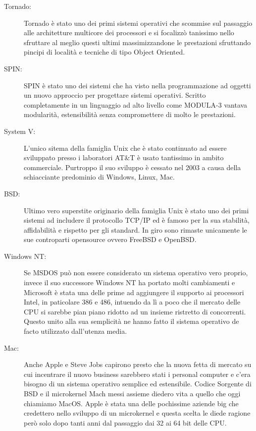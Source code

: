 \begin{description}
  \item[Tornado:] Tornado è stato uno dei primi sistemi operativi che scommise sul passaggio alle architetture multicore dei processori e si focalizzò tanissimo nello sfruttare al meglio questi ultimi massimizzandone le prestazioni sfruttando pincipi di località e tecniche di tipo Object Oriented.
  \item[SPIN:] SPIN è stato uno dei sistemi che ha visto nella programmazione ad oggetti un nuovo approccio per progettare sistemi operativi. Scritto completamente in un linguaggio ad alto livello come MODULA-3 vantava modularità, estensibilità senza compromettere di molto le prestazioni.
  \item[System V:] L'unico sitema della famiglia Unix che è stato continuato ad essere sviluppato presso i laboratori AT\&T è usato tantissimo in ambito commerciale. Purtroppo il suo sviluppo è cessato nel 2003 a causa della schiacciante predominio di Windows, Linux, Mac.
  \item[BSD:] Ultimo vero superstite originario della famiglia Unix è stato uno dei primi sistemi ad includere il protocollo TCP/IP ed è famoso per la sua stabilità, affidabilità e rispetto per gli standard. In giro sono rimaste unicamente le sue controparti opensource ovvero FreeBSD e OpenBSD.
  \item[Windows NT:] Se MSDOS può non essere considerato un sistema operativo vero proprio, invece il suo successore Windows NT ha portato molti cambiamenti e Microsoft è stata una delle prime ad aggiungere il supporto ai processori Intel, in paticolare 386 e 486, intuendo da lì a poco che il mercato delle CPU si sarebbe pian piano ridotto ad un insieme ristretto di concorrenti. Questo unito alla sua semplicità ne hanno fatto il sistema operativo de facto utilizzato dall'utenza media.
  \item[Mac:] Anche Apple e Steve Jobs capirono presto che la nuova fetta di mercato su cui incentrare il nuovo business sarebbero stati i personal computer e c'era bisogno di un sistema operativo semplice ed estensibile. Codice Sorgente di BSD e il microkernel Mach messi assieme diedero vita a quello che oggi chiamiamo MacOS. Apple è stata una delle pochissime aziende big che credettero nello sviluppo di un microkernel e questa scelta le diede ragione però solo dopo tanti anni dal passaggio dai 32 ai 64 bit delle CPU.

\end{description}
